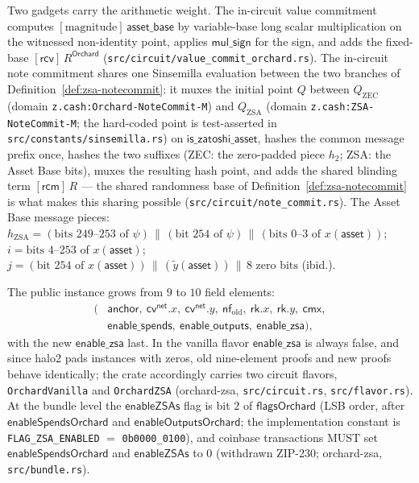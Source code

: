 \documentclass[11pt,a4paper]{article}
\theoremstyle{definition}
\newcommand{\nfsym}{\mathsf{nf}}
\newcommand{\cmx}{\mathsf{cmx}}
\newcommand{\cvsym}{\mathsf{cv}}
\newcommand{\rk}{\mathsf{rk}}
\newcommand{\rcv}{\ensuremath{\mathsf{rcv}}}
\newcommand{\rcm}{\ensuremath{\mathsf{rcm}}}
\begin{document}
Two gadgets carry the arithmetic weight. The in-circuit value commitment
computes $[\mathrm{magnitude}]\,\mathsf{asset\_base}$ by variable-base long
scalar multiplication on the witnessed non-identity point, applies
$\mathsf{mul\_sign}$ for the sign, and adds the fixed-base
$[\rcv]\,R^{\mathsf{Orchard}}$ (\texttt{src/circuit/value\_commit\_orchard.rs}).
The in-circuit note commitment shares one Sinsemilla evaluation between the
two branches of Definition~\ref{def:zsa-notecommit}: it muxes the initial
point $Q$ between $Q_{\mathrm{ZEC}}$ (domain
\texttt{z.cash:Orchard-NoteCommit-M}) and $Q_{\mathrm{ZSA}}$ (domain
\texttt{z.cash:ZSA-NoteCommit-M}; the hard-coded point is test-asserted in
\texttt{src/constants/sinsemilla.rs}) on $\mathsf{is\_zatoshi\_asset}$,
hashes the common message prefix once, hashes the two suffixes (ZEC: the
zero-padded piece $h_2$; ZSA: the Asset Base bits), muxes the resulting hash
point, and adds the shared blinding term $[\rcm]\,R$ --- the shared
randomness base of Definition~\ref{def:zsa-notecommit} is what makes this
sharing possible (\texttt{src/circuit/note\_commit.rs}). The Asset Base
message pieces: $h_{\mathrm{ZSA}} = (\text{bits } 249\text{--}253 \text{ of }
\psi) \,\|\, (\text{bit } 254 \text{ of } \psi) \,\|\, (\text{bits }
0\text{--}3 \text{ of } x(\mathsf{asset}))$; $i = \text{bits }
4\text{--}253$ of $x(\mathsf{asset})$;
$j = (\text{bit } 254 \text{ of } x(\mathsf{asset})) \,\|\,
(\tilde{y}(\mathsf{asset})) \,\|\, 8 \text{ zero bits}$ (ibid.).

The public instance grows from $9$ to $10$ field elements:
\[
\begin{aligned}
\bigl(&\mathsf{anchor},\ \cvsym^{\mathsf{net}}\!.x,\ \cvsym^{\mathsf{net}}\!.y,
\ \nfsym_{\mathrm{old}},\ \rk.x,\ \rk.y,\ \cmx, \\
&\mathsf{enable\_spends},\ \mathsf{enable\_outputs},
  \ \mathsf{enable\_zsa}\bigr),
\end{aligned}
\]
with the new $\mathsf{enable\_zsa}$ last. In the vanilla flavor
$\mathsf{enable\_zsa}$ is always false, and since \textsf{halo2} pads
instances with zeros, old nine-element proofs and new proofs behave
identically; the crate accordingly carries two circuit flavors,
\texttt{OrchardVanilla} and \texttt{OrchardZSA} (\textsf{orchard-zsa},
\texttt{src/circuit.rs}, \texttt{src/flavor.rs}). At the bundle level the
$\mathsf{enableZSAs}$ flag is bit $2$ of $\mathsf{flagsOrchard}$ (LSB order,
after $\mathsf{enableSpendsOrchard}$ and $\mathsf{enableOutputsOrchard}$;
the implementation constant is \texttt{FLAG\_ZSA\_ENABLED} $=$
\texttt{0b0000\_0100}), and coinbase transactions MUST set
$\mathsf{enableSpendsOrchard}$ and $\mathsf{enableZSAs}$ to $0$ (withdrawn
ZIP-230; \textsf{orchard-zsa}, \texttt{src/bundle.rs}).
\end{document}
